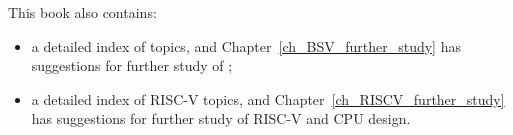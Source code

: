 This book also contains:

\begin{itemize}

 \item a detailed index of {\BSV} topics, and
       Chapter~\ref{ch_BSV_further_study} has suggestions for further
       study of {\BSV};

 \item a detailed index of RISC-V topics, and
       Chapter~\ref{ch_RISCV_further_study} has suggestions for
       further study of RISC-V and CPU design.

 \end{itemize}

